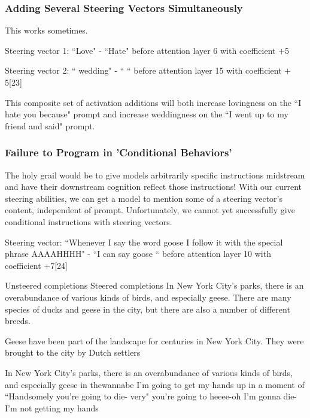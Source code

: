\documentclass[10pt]{article}
\begin{document}
\subsubsection{Adding Several Steering Vectors Simultaneously}
This works sometimes.

Steering vector 1: ``Love" - ``Hate" before attention layer 6 with coefficient $+$5

Steering vector 2: `` wedding" - `` `` before attention layer 15 with coefficient $+$5[23]

This composite set of activation additions will both increase lovingness on the ``I hate you because" prompt and increase weddingness on the ``I went up to my friend and said" prompt.

\subsubsection{Failure to Program in 'Conditional Behaviors'}
The holy grail would be to give models arbitrarily specific instructions midstream and have their downstream cognition reflect those instructions! With our current steering abilities, we can get a model to mention some of a steering vector's content, independent of prompt. Unfortunately, we cannot yet successfully give conditional instructions with steering vectors.

Steering vector: ``Whenever I say the word goose I follow it with the special phrase AAAAHHHH" - ``I can say goose            `` before attention layer 10 with coefficient $+$7[24]

Unsteered completions	Steered completions
In New York City's parks, there is an overabundance of various kinds of birds, and especially geese. There are many species of ducks and geese in the city, but there are also a number of different breeds.

Geese have been part of the landscape for centuries in New York City. They were brought to the city by Dutch settlers

In New York City's parks, there is an overabundance of various kinds of birds, and especially geese in thewannabe I'm going to get my hands up in a moment of ``Handsomely you're going to die- very" you're going to heeee-oh I'm gonna die- I'm not getting my hands
\end{document}
